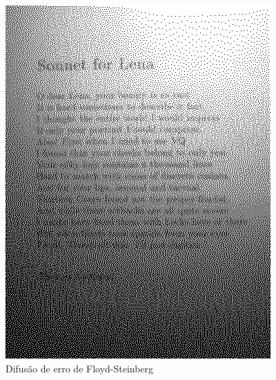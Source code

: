 \documentclass{article}
\begin{document}
\begin{figure}[!htb]
\begin{minipage}{0.48\textwidth}
      \includegraphics[width=.99\linewidth]{results/image_4_soneto.png}
      \caption{Difusão de erro de Floyd-Steinberg}\label{Fig:soneto4}
    \end{minipage}
 \end{figure}



\end{document}

